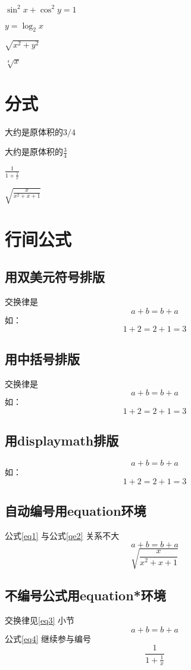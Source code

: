 \documentclass{article} %
\begin{document}
	$\sin^2 x + \cos^2 y = 1$
	
	$y = \log_2 x$
	
	$\sqrt{x^2+y^2}$
	
	$\sqrt[4]{x}$
	
	\section{分式}
	大约是原体积的$3/4$
	
	大约是原体积的$\frac{3}{4}$
	
	$\frac{1}{1+\frac{1}{x}}$
	
	$\sqrt{\frac{x}{x^2+x+1}}$
	
	\section{行间公式}
	\subsection{用双美元符号排版}
	交换律是
	$$a+b=b+a$$
	如：
	$$1+2=2+1=3$$
	\subsection{用中括号排版}
	交换律是
	\[a+b=b+a\]
	如：
	\[1+2=2+1=3\]
	\subsection{用displaymath排版}
	\begin{displaymath}
		a+b=b+a
	\end{displaymath}
	如：
	\begin{displaymath}
		1+2=2+1=3
	\end{displaymath}

	\subsection{自动编号用equation环境}
	公式\ref{eq1} 与公式\ref{qe2} 关系不大
	\begin{equation}
		\label{eq1}
		a+b=b+a
	\end{equation}
	\begin{equation}
		\sqrt{\frac{x}{x^2+x+1}}
		\label{qe2}
	\end{equation}

	\subsection{不编号公式用equation*环境}
	交换律见\ref{eq3} 小节	%
	\begin{equation*}
		a+b=b+a
		\label{eq3}
	\end{equation*}
	公式\ref{eq4} 继续参与编号
	\begin{equation}
		\frac{1}{1+\frac{1}{x}}
		\label{eq4}
	\end{equation}
\end{document}
